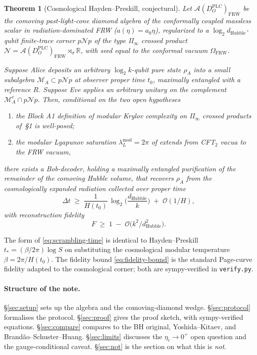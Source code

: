 \documentclass[11pt]{article}
\newtheorem{theorem}{Theorem}
\theoremstyle{definition}
\theoremstyle{remark}
\newcommand{\R}{\mathbb{R}}
\newcommand{\N}{\mathcal{N}}
\newcommand{\M}{\mathcal{M}}
\renewcommand{\AA}{\mathcal{A}}
\newcommand{\OO}{\mathcal{O}}
\newcommand{\FRW}{\mathrm{FRW}}
\newcommand{\PLC}{\mathrm{PLC}}
\begin{document}
\begin{theorem}[Cosmological Hayden--Preskill, conjectural]\label{thm:cosmoHP}
Let $\AA(D_O^{\PLC})_\FRW$ be the comoving past-light-cone diamond algebra
of the conformally coupled massless scalar in radiation-dominated FRW
($a(\eta)=a_0\eta$), regularized to a $\log_2 d_{\mathrm{Hubble}}$-qubit
finite-trace corner $p\N p$ of the type II$_\infty$ crossed product
$\N=\AA(D_O^{\PLC})_\FRW\rtimes_\sigma\R$, with seed equal to the
conformal vacuum $\Omega_\FRW$.

Suppose Alice deposits an arbitrary $\log_2 k$-qubit pure state $\rho_A$
into a small subalgebra $\M_A\subset p\N p$ at observer proper time $t_0$,
maximally entangled with a reference $R$. Suppose Eve applies an arbitrary
unitary on the complement $\M_A^c\cap p\N p$. Then, conditional on the
two open hypotheses
\begin{enumerate}[label={\rm (H\arabic*)}]
\item the Block A1 definition of modular Krylov complexity on II$_\infty$
      crossed products of \cite{piste1note}\,\S1 is well-posed;
\item the modular Lyapunov saturation $\lambda_L^{\mathrm{mod}}=2\pi$
      of \cite{CMPT24} extends from CFT$_2$ vacua to the FRW vacuum,
\end{enumerate}
there exists a Bob-decoder, holding a maximally entangled purification of
the remainder of the comoving Hubble volume, that recovers $\rho_A$ from
the cosmologically expanded radiation collected over proper time
\begin{equation}\label{eq:scrambling-time}
  \Delta t \;\ge\; \frac{1}{H(t_0)}\,\log_2\!\Big(\frac{d_{\mathrm{Hubble}}}{k}\Big)
            \;+\; \OO(1/H),
\end{equation}
with reconstruction fidelity
\begin{equation}\label{eq:fidelity-bound}
  F \;\ge\; 1 \;-\; \OO\!\big(k^2/d_{\mathrm{Hubble}}^2\big).
\end{equation}
\end{theorem}

The form of \eqref{eq:scrambling-time} is identical to Hayden--Preskill
$t_*=(\beta/2\pi)\log S$ on substituting the cosmological modular
temperature $\beta=2\pi/H(t_0)$. The fidelity bound
\eqref{eq:fidelity-bound} is the standard Page-curve fidelity
\cite{HaydenPreskill07,YoshidaKitaev17} adapted to the cosmological corner;
both are sympy-verified in \texttt{verify.py}.

\paragraph{Structure of the note.} \S\ref{sec:setup} sets up the algebra
and the comoving-diamond wedge. \S\ref{sec:protocol} formalises the protocol.
\S\ref{sec:proof} gives the proof sketch, with sympy-verified equations.
\S\ref{sec:compare} compares to the BH original, Yoshida--Kitaev, and
Brand\~ao--Schuster--Huang. \S\ref{sec:limits} discusses the
$\eta_i\to 0^+$ open question and the gauge-conditional caveat.
\S\ref{sec:not} is the section on what this is \emph{not}.
\end{document}
